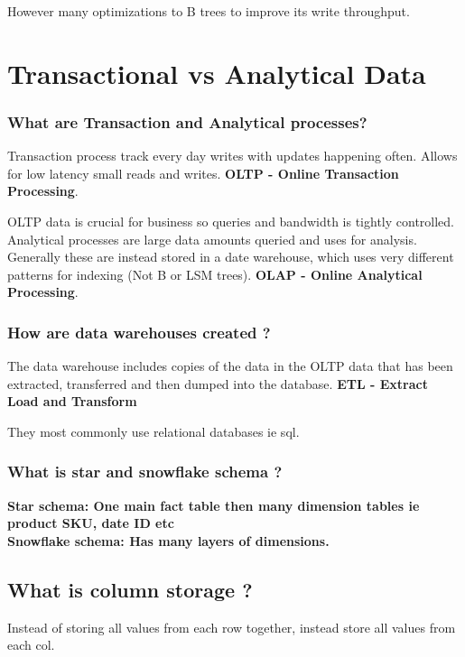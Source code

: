\documentclass[11pt]{scrartcl} %
\begin{document}
However many optimizations to B trees to improve its write throughput.

\section{Transactional vs Analytical Data}

\subsubsection{What are Transaction and Analytical processes?}

Transaction process track every day writes with updates happening often. Allows for low latency
small reads and writes. \textbf{OLTP - Online Transaction Processing}. 

OLTP data is crucial for business so queries and bandwidth is tightly controlled.\\

Analytical processes are large data amounts queried and uses for analysis. Generally these are instead
stored in a date warehouse, which uses very different patterns for indexing (Not B or LSM trees). 
\textbf{OLAP - Online Analytical Processing}.

\subsubsection{How are data warehouses created ?}

The data warehouse includes copies of the data in the OLTP data that has been extracted, transferred and
then dumped into the database. \textbf{ETL - Extract Load and Transform}

They most commonly use relational databases ie sql.

\subsubsection{What is star and snowflake schema ?}

\textbf{Star schema: One main fact table then many dimension tables ie product SKU, date ID etc}\\
\textbf{Snowflake schema: Has many layers of dimensions.}

\subsection{What is column storage ?}

Instead of storing all values from each row together, instead store all values from each col.
\end{document}
